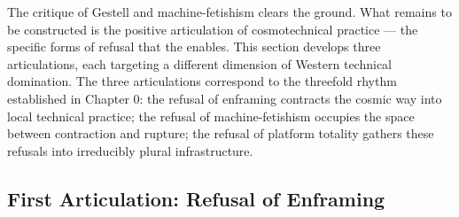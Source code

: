 The critique of Gestell and machine-fetishism clears the ground. What remains to be constructed is the positive articulation of cosmotechnical practice — the specific forms of refusal that the   enables. This section develops three articulations, each targeting a different dimension of Western technical domination. The three articulations correspond to the threefold rhythm established in Chapter 0: the refusal of enframing contracts the cosmic way into local technical practice; the refusal of machine-fetishism occupies the space between contraction and rupture; the refusal of platform totality gathers these refusals into irreducibly plural infrastructure.

\subsection{First Articulation: Refusal of Enframing}


